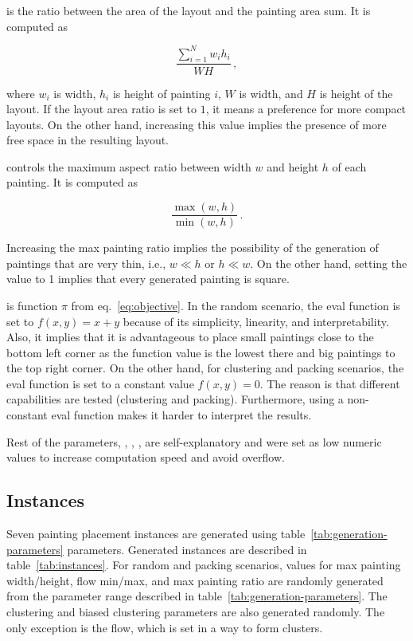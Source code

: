  is the ratio between the area of the layout and the painting area sum.
It is computed as

\[
    \dfrac{\sum\limits_{i=1}^{N} w_i h_i}{WH}\,,
\]

where $w_i$ is width, $h_i$ is height of painting $i$, $W$ is width, and $H$ is height of the layout.
If the layout area ratio is set to $1$, it means a preference for more compact layouts.
On the other hand,
increasing this value implies the presence of more free space in the resulting layout.

 controls the maximum aspect ratio between width $w$ and height $h$ of each painting.
It is computed as

\[
    \dfrac{\max(w,h)}{\min(w,h)}\,.
\]

Increasing the max painting ratio implies the possibility of the generation of paintings
that are very thin, i.e., $w \ll h$ or $h \ll w$.
On the other hand, setting the value to 1
implies that every generated painting is square.

 is function $\pi$ from eq.~\ref{eq:objective}.
In the random scenario, the eval function is set to $f(x,y) = x+y$ because of its simplicity, linearity, and interpretability.
Also, it implies that it is advantageous to place small paintings close to the bottom left corner as the function value is the lowest there and
big paintings to the top right corner.
On the other hand, for clustering and packing scenarios, the eval function is set to a constant value $f(x,y) = 0$.
The reason is that different capabilities are tested (clustering and packing).
Furthermore, using a non-constant eval function makes it harder to interpret the results.

Rest of the parameters, , , , 
are self-explanatory and were set as low numeric values to increase computation speed and avoid overflow.

\subsection{Instances}\label{subsec:instances}

Seven painting placement instances are generated using table~\ref{tab:generation-parameters} parameters.
Generated instances are described in table~\ref{tab:instances}.
For random and packing scenarios, values for max painting width/height, flow min/max, and max painting ratio are randomly generated from the parameter range described in table~\ref{tab:generation-parameters}.
The clustering and biased clustering parameters are also generated randomly.
The only exception is the flow, which is set in a way to form clusters.

